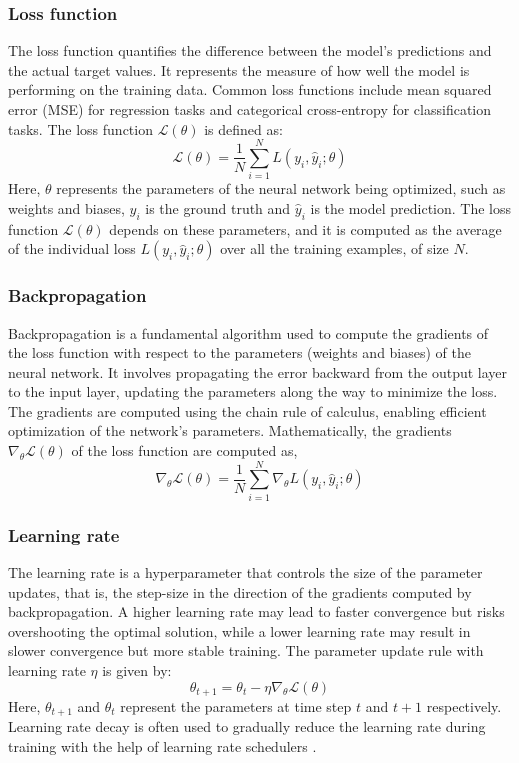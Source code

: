\subsubsection{Loss function}
The loss function quantifies the difference between the model's predictions and the actual target values. It represents the measure of how well the model is performing on the training data. Common loss functions include mean squared error (MSE) for regression tasks and categorical cross-entropy for classification tasks. The loss function $\mathcal{L}(\theta)$ is defined as: 
\begin{equation}
    \mathcal{L}(\theta)=\frac{1}{N} \sum_{i=1}^N L\left(y_i, \hat{y}_i ; \theta\right)
    \end{equation}
Here, $\theta$ represents the parameters of the neural network being optimized, such as weights and biases, $y_i$ is the ground truth and $\hat{y}_i $ is the model prediction. The loss function $\mathcal{L}(\theta)$ depends on these parameters, and it is computed as the average of the individual loss $L\left(y_i, \hat{y}_i ; \theta\right)$ over all the training examples, of size $N$.
\subsubsection{Backpropagation}
Backpropagation is a fundamental algorithm used to compute the gradients of the loss function with respect to the parameters (weights and biases) of the neural network. It involves propagating the error backward from the output layer to the input layer, updating the parameters along the way to minimize the loss. The gradients are computed using the chain rule of calculus, enabling efficient optimization of the network's parameters. Mathematically, the gradients $\nabla_\theta \mathcal{L}(\theta)$ of the loss function are computed as,
\begin{equation}
    \nabla_\theta \mathcal{L}(\theta)=\frac{1}{N} \sum_{i=1}^N \nabla_\theta L\left(y_i, \hat{y}_i ; \theta\right)
    \end{equation}
\subsubsection{Learning rate}
The learning rate is a hyperparameter that controls the size of the parameter updates, that is, the step-size in the direction of the gradients computed by backpropagation. A higher learning rate may lead to faster convergence but risks overshooting the optimal solution, while a lower learning rate may result in slower convergence but more stable training. The parameter update rule with learning rate $\eta$ is given by:
\begin{equation}
    \theta_{t+1}=\theta_t-\eta \nabla_\theta \mathcal{L}(\theta)
    \end{equation}
Here, $\theta_{t+1}$ and $\theta_t$ represent the parameters at time step $t$ and $t+1$ respectively. Learning rate decay is often used to gradually reduce the learning rate during training with the help of learning rate schedulers .
